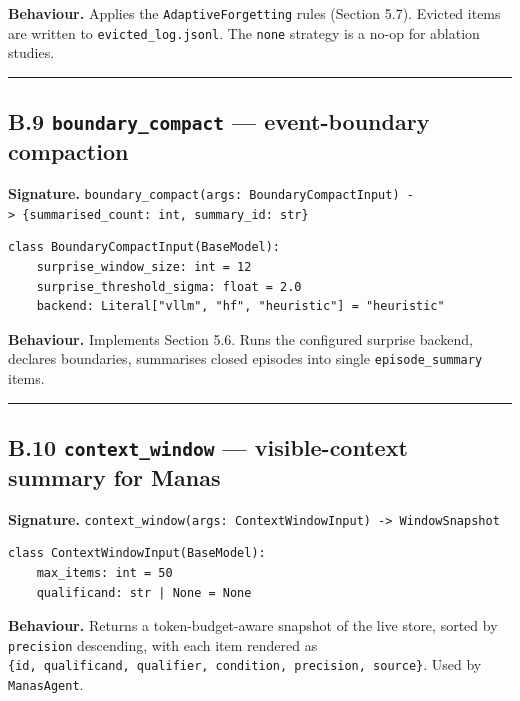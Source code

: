 \textbf{Behaviour.} Applies the \texttt{AdaptiveForgetting} rules (Section 5.7). Evicted items are written to \texttt{evicted\_log.jsonl}. The \texttt{none} strategy is a no-op for ablation studies.

\begin{center}\rule{0.5\linewidth}{0.5pt}\end{center}

\subsection{\texorpdfstring{B.9 \texttt{boundary\_compact} --- event-boundary compaction}{B.9 boundary\_compact --- event-boundary compaction}}\label{b.9-boundary_compact-event-boundary-compaction}

\textbf{Signature.} \texttt{boundary\_compact(args:\ BoundaryCompactInput)\ -\textgreater{}\ \{summarised\_count:\ int,\ summary\_id:\ str\}}

\begin{verbatim}
class BoundaryCompactInput(BaseModel):
    surprise_window_size: int = 12
    surprise_threshold_sigma: float = 2.0
    backend: Literal["vllm", "hf", "heuristic"] = "heuristic"
\end{verbatim}

\textbf{Behaviour.} Implements Section 5.6. Runs the configured surprise backend, declares boundaries, summarises closed episodes into single \texttt{episode\_summary} items.

\begin{center}\rule{0.5\linewidth}{0.5pt}\end{center}

\subsection{\texorpdfstring{B.10 \texttt{context\_window} --- visible-context summary for Manas}{B.10 context\_window --- visible-context summary for Manas}}\label{b.10-context_window-visible-context-summary-for-manas}

\textbf{Signature.} \texttt{context\_window(args:\ ContextWindowInput)\ -\textgreater{}\ WindowSnapshot}

\begin{verbatim}
class ContextWindowInput(BaseModel):
    max_items: int = 50
    qualificand: str | None = None
\end{verbatim}

\textbf{Behaviour.} Returns a token-budget-aware snapshot of the live store, sorted by \texttt{precision} descending, with each item rendered as \texttt{\{id,\ qualificand,\ qualifier,\ condition,\ precision,\ source\}}. Used by \texttt{ManasAgent}.

